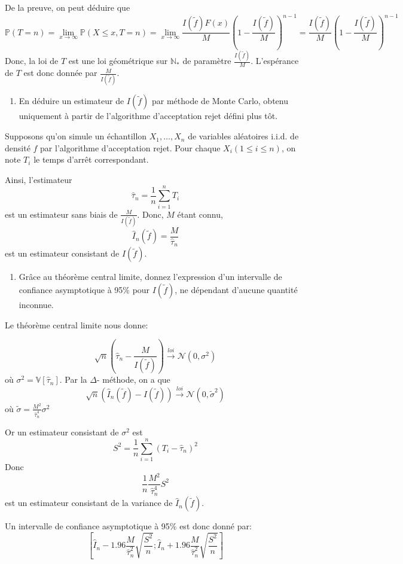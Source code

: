 \documentclass[]{article}
\providecommand{\tightlist}{%
  \setlength{\itemsep}{0pt}\setlength{\parskip}{0pt}}
\newenvironment{Correction}%
  { \vspace{\baselineskip}\begin{mdframed}[backgroundcolor=my_green]}%
  {\end{mdframed}}
\begin{document}
\begin{Correction}
De la preuve, on peut déduire que 
$$\mathbb{P}\left(T = n \right) = \lim_{x \rightarrow \infty}\mathbb{P}\left(X\leq x, T = n \right) = \lim_{x \rightarrow \infty} \frac{I(\tilde{f})F(x)}{M}\left(1 - \frac{I(\tilde{f})}{M}\right)^{n - 1} =  \frac{I(\tilde{f})}{M}\left(1 - \frac{I(\tilde{f})}{M}\right)^{n - 1}$$
Donc, la loi de $T$ est une loi géométrique sur $\mathbb{N}_*$ de paramètre $\frac{I(\tilde{f})}{M}$. 
L'espérance de $T$ est donc donnée par $\frac{M}{I(\tilde{f})}$.
\end{Correction}

\begin{enumerate}
\def\labelenumi{\arabic{enumi}.}
\setcounter{enumi}{2}
\tightlist
\item
  En déduire un estimateur de \(I(\tilde{f})\) par méthode de Monte
  Carlo, obtenu uniquement à partir de l'algorithme d'acceptation rejet
  défini plus tôt.
\end{enumerate}

\begin{Correction}
Supposons qu'on simule un échantillon $X_1,\dots,X_n$ de variables aléatoires i.i.d.
de densité $f$ par l'algorithme d'acceptation rejet. Pour chaque $X_i (1\leq i\leq n)$, on note $T_i$ le temps d'arrêt correspondant.

Ainsi, l'estimateur 
$$\hat{\tau}_n = \frac{1}{n}\sum_{i = 1}^nT_i$$ 
est un estimateur sans biais de $\frac{M}{I(\tilde{f})}$. Donc, $M$  étant connu,
$$\hat{I}_n(\tilde{f}) = \frac{M}{\hat{\tau}_n}$$
est un estimateur consistant de $I(\tilde{f})$.
\end{Correction}

\begin{enumerate}
\def\labelenumi{\arabic{enumi}.}
\setcounter{enumi}{3}
\tightlist
\item
  Grâce au théorème central limite, donnez l'expression d'un intervalle
  de confiance asymptotique à 95\% pour \(I(\tilde{f})\), ne dépendant
  d'aucune quantité inconnue.
\end{enumerate}

\begin{Correction}
Le théorème central limite nous donne:

$$\sqrt{n}\left(\hat{\tau}_n - \frac{M}{I(\tilde{f})}\right) \overset{loi}{\longrightarrow} \mathcal{N}\left(0, \sigma^2\right)$$
où $\sigma^2 = \mathbb{V}\left[\hat{\tau}_n\right]$.
Par la $\Delta$- méthode, on a que
$$\sqrt{n}\left(\hat{I}_n(\tilde{f}) - I(\tilde{f})\right) \overset{loi}{\longrightarrow} \mathcal{N}\left(0, \tilde{\sigma}^2\right)$$
où $\tilde{\sigma} = \frac{M^2}{\hat{\tau}_n^4}\sigma^2$

Or un estimateur consistant de $\sigma^2$ est 
$$S^2 = \frac{1}{n}\sum_{i = 1}^n\left(T_i - \hat{\tau}_n \right)^2$$
Donc
$$\frac{1}{n}\frac{M^2}{\hat{\tau}_n^4}S^2$$
est un estimateur consistant de la variance de $\hat{I}_n(\tilde{f})$.

Un intervalle de confiance asymptotique à 95\% est donc donné par:
$$\left[\hat{I}_n - 1.96 \frac{M}{\hat{\tau}_n^2}\sqrt{\frac{S^2}{n}};
\hat{I}_n + 1.96 \frac{M}{\hat{\tau}_n^2}\sqrt{\frac{S^2}{n}}\right]$$
\end{Correction}
\end{document}
